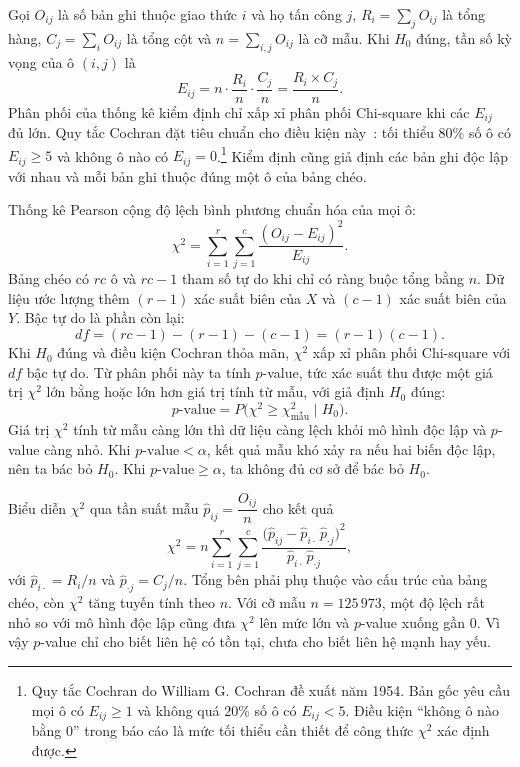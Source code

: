 Gọi $O_{ij}$ là số bản ghi thuộc giao thức $i$ và họ tấn công $j$, $R_i = \sum\limits_{j} O_{ij}$ là tổng hàng, $C_j = \sum\limits_{i} O_{ij}$ là tổng cột và $n = \sum\limits_{i,j} O_{ij}$ là cỡ mẫu. Khi $H_0$ đúng, tần số kỳ vọng của ô $(i, j)$ là
\begin{equation}
  \label{eq:t34:expected-frequency}
  E_{ij} = n \cdot \frac{R_i}{n} \cdot \frac{C_j}{n} = \frac{R_i \times C_j}{n}.
\end{equation}
Phân phối của thống kê kiểm định chỉ xấp xỉ phân phối Chi-square khi các $E_{ij}$ đủ lớn. Quy tắc Cochran đặt tiêu chuẩn cho điều kiện này~\cite{task34_cochran1954}: tối thiểu $80\%$ số ô có $E_{ij} \geq 5$ và không ô nào có $E_{ij} = 0$.\footnote{Quy tắc Cochran do William G. Cochran đề xuất năm 1954. Bản gốc yêu cầu mọi ô có $E_{ij} \geq 1$ và không quá $20\%$ số ô có $E_{ij} < 5$. Điều kiện ``không ô nào bằng $0$'' trong báo cáo là mức tối thiểu cần thiết để công thức $\chi^2$ xác định được.} Kiểm định cũng giả định các bản ghi độc lập với nhau và mỗi bản ghi thuộc đúng một ô của bảng chéo.

Thống kê Pearson cộng độ lệch bình phương chuẩn hóa của mọi ô:
\begin{equation}
  \label{eq:t34:chi-square-statistic}
  \chi^2 = \sum_{i=1}^{r} \sum_{j=1}^{c} \frac{(O_{ij} - E_{ij})^2}{E_{ij}}.
\end{equation}
Bảng chéo có $rc$ ô và $rc - 1$ tham số tự do khi chỉ có ràng buộc tổng bằng $n$. Dữ liệu ước lượng thêm $(r - 1)$ xác suất biên của $X$ và $(c - 1)$ xác suất biên của $Y$. Bậc tự do là phần còn lại:
\begin{equation}
  \label{eq:t34:degrees-of-freedom}
  df = (rc - 1) - (r - 1) - (c - 1) = (r - 1)(c - 1).
\end{equation}
Khi $H_0$ đúng và điều kiện Cochran thỏa mãn, $\chi^2$ xấp xỉ phân phối Chi-square với $df$ bậc tự do. Từ phân phối này ta tính $p$-value, tức xác suất thu được một giá trị $\chi^2$ lớn bằng hoặc lớn hơn giá trị tính từ mẫu, với giả định $H_0$ đúng:
\begin{equation}
  \label{eq:t34:p-value}
  p\text{-value} = P\bigl(\chi^2 \geq \chi^2_{\text{mẫu}} \mid H_0\bigr).
\end{equation}
Giá trị $\chi^2$ tính từ mẫu càng lớn thì dữ liệu càng lệch khỏi mô hình độc lập và $p$-value càng nhỏ. Khi $p\text{-value} < \alpha$, kết quả mẫu khó xảy ra nếu hai biến độc lập, nên ta bác bỏ $H_0$. Khi $p\text{-value} \geq \alpha$, ta không đủ cơ sở để bác bỏ $H_0$.

Biểu diễn $\chi^2$ qua tần suất mẫu $\hat{p}_{ij} = \dfrac{O_{ij}}{n}$ cho kết quả
\begin{equation}
  \label{eq:t34:chi-square-proportions}
  \chi^2 = n \sum_{i=1}^{r} \sum_{j=1}^{c} \frac{\bigl(\hat{p}_{ij} - \hat{p}_{i\cdot}\,\hat{p}_{\cdot j}\bigr)^2}{\hat{p}_{i\cdot}\,\hat{p}_{\cdot j}},
\end{equation}
với $\hat{p}_{i\cdot} = R_i/n$ và $\hat{p}_{\cdot j} = C_j/n$. Tổng bên phải phụ thuộc vào cấu trúc của bảng chéo, còn $\chi^2$ tăng tuyến tính theo $n$. Với cỡ mẫu $n = 125\,973$, một độ lệch rất nhỏ so với mô hình độc lập cũng đưa $\chi^2$ lên mức lớn và $p$-value xuống gần $0$. Vì vậy $p$-value chỉ cho biết liên hệ có tồn tại, chưa cho biết liên hệ mạnh hay yếu.

